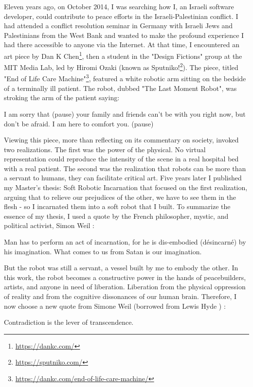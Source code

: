 \documentclass[dissertation,math,vertlayout,pdfa,colorlinks,nologo]{aaltoseries}
\begin{document}
\begin{preface}[Lahti]
Eleven years ago, on October 2014, I was searching how I, an Israeli software developer, could contribute to peace efforts in the Israeli-Palestinian conflict. I had attended a conflict resolution seminar in Germany with Israeli Jews and Palestinians from the West Bank and wanted to make the profound experience I had there accessible to anyone via the Internet. At that time, I encountered an art piece by Dan K Chen\footnote{\url{https://dankc.com/}}, then a student in the "Design Fictions" group at the MIT Media Lab, led by Hiromi Ozaki (known as Sputniko!\footnote{\url{https://sputniko.com/}}). The piece, titled "End of Life Care Machine"\footnote{\url{https://dankc.com/end-of-life-care-machine/}}, featured a white robotic arm sitting on the bedside of a terminally ill patient. The robot, dubbed "The Last Moment Robot", was stroking the arm of the patient saying:
\begin{displayquote}
I am sorry that (pause) your family and friends can’t be with you right now, but don’t be afraid. I am here to comfort you. (pause)
\end{displayquote}
Viewing this piece, more than reflecting on its commentary on society, invoked two realizations. The first was the power of the physical. No virtual representation could reproduce the intensity of the scene in a real hospital bed with a real patient. The second was the realization that robots can be more than a servant to humans, they can facilitate critical art. 
\vfil \break
Five years later I published my Master's thesis: Soft Robotic Incarnation \cite{peledSoftRoboticIncarnation2019} that focused on the first realization, arguing that to relieve our prejudices of the other, we have to see them in the flesh - so I incarnated them into a soft robot that I built. To summarize the essence of my thesis, I used a quote by the French philosopher, mystic, and political activist, Simon Weil \cite[p. 54]{weilGravityGrace2002}:
\begin{displayquote}
Man has to perform an act of incarnation, for he is dis-embodied (désincarné) by his imagination. What comes to us from Satan is our imagination.
\end{displayquote}

But the robot was still a servant, a vessel built by me to embody the other. In this work, the robot becomes a constructive power in the hands of peacebuilders, artists, and anyone in need of liberation. Liberation from the physical oppression of reality and from the cognitive dissonances of our human brain. Therefore, I now choose a new quote from Simone Weil (borrowed from Lewis Hyde \cite{hydeTricksterMakesThis2017}) \cite[p. 134]{weilFirstLastNotebooks1970}:
\begin{displayquote}
Contradiction is the lever of transcendence.
\end{displayquote}

\end{preface}
\end{document}
